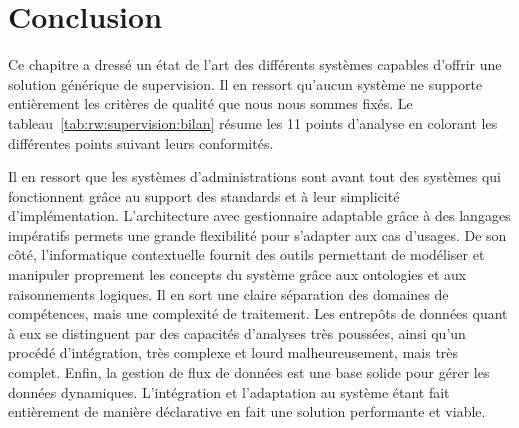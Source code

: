 \section{Conclusion}
Ce chapitre a dressé un état de l'art des différents systèmes capables d'offrir une solution générique de supervision. Il en ressort qu'aucun système ne supporte entièrement les critères de qualité que nous nous sommes fixés. Le tableau~\ref{tab:rw:supervision:bilan} résume les 11 points d'analyse en colorant les différentes points suivant leurs conformités. 

Il en ressort que les systèmes d'administrations sont avant tout des systèmes qui fonctionnent grâce au support des standards et à leur simplicité d'implémentation. L'architecture avec gestionnaire adaptable grâce à des langages impératifs permets une grande flexibilité pour s'adapter aux cas d'usages. De son côté, l'informatique contextuelle fournit des outils permettant de modéliser et manipuler proprement les concepts du système grâce aux ontologies et aux raisonnements logiques. Il en sort une claire séparation des domaines de compétences, mais une complexité de traitement. Les entrepôts de données quant à eux se distinguent par des capacités d'analyses très poussées, ainsi qu'un procédé d'intégration, très complexe et lourd malheureusement, mais très complet. Enfin, la gestion de flux de données est une base solide pour gérer les données dynamiques. L'intégration et l'adaptation au système étant fait entièrement de manière déclarative en fait une solution performante et viable.

